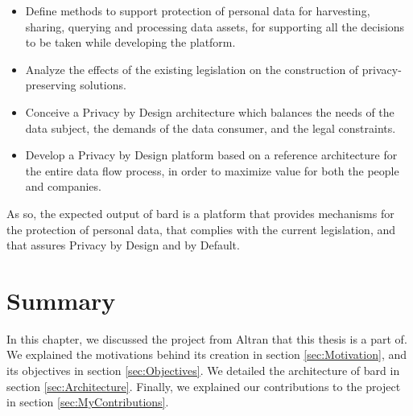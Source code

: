 \begin{itemize}
	
	\item Define methods to support protection of personal data for harvesting, sharing, querying and processing data assets, for supporting all the decisions to be taken while developing the platform.
	\item Analyze the effects of the existing legislation on the construction of privacy-preserving solutions.
	\item Conceive a Privacy by Design architecture which balances the needs of the data subject, the demands of the data consumer, and the legal constraints.
	\item Develop a Privacy by Design platform based on a reference architecture for the entire data flow process, in order to maximize value for both the people and companies.
\end{itemize}

As so, the expected output of \ac{bard} is a platform that provides mechanisms for the protection of personal data, that complies with the current legislation, and that assures Privacy by Design and by Default.





  
\section{Summary}
\label{sec:SummaryBARD}

In this chapter, we discussed the project from Altran that this thesis is a part of.
We explained the motivations behind its creation in section \ref{sec:Motivation}, and its objectives in section \ref{sec:Objectives}.
We detailed the architecture of \ac{bard} in section \ref{sec:Architecture}.
Finally, we explained our contributions to the project in section \ref{sec:MyContributions}.


